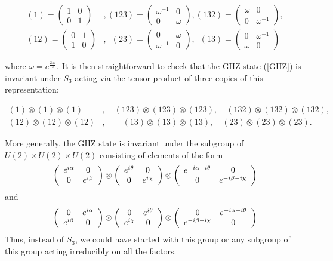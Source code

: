 \documentclass[12pt]{article}
\theoremstyle{definition}
\newcommand{\be}{\begin{equation}}
\newcommand{\ee}{\end{equation}}
\newcommand{\ba}{\begin{array}}
\newcommand{\ea}{\end{array}}
\begin{document}
\begin{align*}
(1)  = \left(\begin{matrix} 1&0\\0&1 \end{matrix} \right)&, (123)=\left( \begin{matrix} \omega^{-1}&0\\0&\omega  \end{matrix} \right), (132)=\left( \begin{matrix} \omega&0\\0&\omega^{-1}  \end{matrix} \right),\\
 (12)=\left( \begin{matrix} 0&1\\1&0 \end{matrix} \right)&,\, \, \,  (23)=\left( \begin{matrix} 0&\omega \\\omega^{-1}&0 \end{matrix} \right),\, \, \,  (13)=\left( \begin{matrix} 0&\omega^{-1} \\\omega&0 \end{matrix} \right)
\end{align*}

where $\omega = e^{\frac{2 \pi i}{3}}$. It is
then straightforward to check that the GHZ state (\ref{GHZ}) is
invariant under $S_3$ acting via the tensor product of three copies of
this representation:

\begin{align*}
(1)  \otimes (1)  \otimes (1)&,\quad  (123)  \otimes (123)  \otimes
(123),\quad  (132)   \otimes (132)
  \otimes (132) ,\quad \\
 (12)  \otimes
(12)  \otimes (12)&,\quad \quad  (13)  \otimes (13)  \otimes
(13),\quad (23)  \otimes (23)  \otimes (23).
\end{align*}


More generally, the GHZ state is invariant under the subgroup of $U(2)
\times U(2) \times U(2)$ consisting of elements of the form \be \left(
\ba{cc} e^{i \alpha} & 0 \cr 0 & e^{i \beta} \ea \right)  \otimes
\left( \ba{cc} e^{i \theta} & 0 \cr 0 & e^{i \chi} \ea \right)  \otimes
\left( \ba{cc} e^{-i \alpha - i \theta} & 0 \cr 0 & e^{-i \beta - i
\chi} \ea \right) \ee and \be \left( \ba{cc} 0 & e^{i \alpha} \cr e^{i
\beta} & 0 \ea \right)  \otimes \left( \ba{cc} 0 & e^{i \theta} \cr
e^{i \chi} & 0 \ea \right)  \otimes \left( \ba{cc} 0 & e^{-i \alpha - i
\theta} \cr e^{-i \beta - i \chi} & 0 \ea \right) \ee Thus, instead of
$S_3$, we could have started with this group or any subgroup of this
group acting irreducibly on all the factors.
\end{document}
